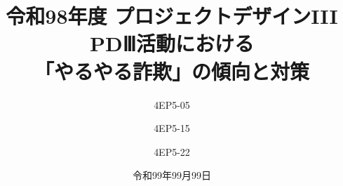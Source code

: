 


\renewcommand{\lstlistingname}{リスト}
\usepackage[hang,bf,labelsep=colon,figurename=図, tablename=表, singlelinecheck=off,justification=centering,labelfont=bf,textfont=bf]{caption} 


% 

\iffalse 
\MyLogo{\texttt{[image: fig/logo/kit\_landscape1.eps]}}
\lfoot{\texttt{[image: fig/logo/kit\_landscape1.eps]}}
\fancypagestyle{myfirstpage}
{
	\fancyhf{}
	\fancyfoot[C]{\texttt{[image: fig/logo/kit\_landscape1.eps]}}
	\renewcommand{\headrulewidth}{0pt} %
}

\else
{} %
{
	\fancyhf{}
	\renewcommand{\headrulewidth}{0pt} %
}
\fi

% 
%
\cfoot{\thepage/\pageref{LastPage}}





% 
%

\title{
{\normalsize 令和98年度 プロジェクトデザインIII}\\\vspace{10mm}
{\LARGE PDⅢ活動における\\「やるやる詐欺」の傾向と対策}
}
\date{令和99年99月99日}
\author{
4EP5-05\\  \and
4EP5-15\\  \and 
4EP5-22\\ 
}




